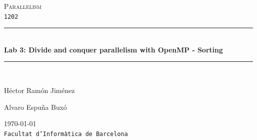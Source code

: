 \documentclass[a4paper,11pt]{article}
\begin{document}
\begin{titlepage}
\begin{center}
\textsc{\Large Parallelism}
\\
\texttt{1202}
\\[1.5cm]
\rule{\linewidth}{0.5mm}
\\[0.4cm]
{\huge
\bfseries
Lab 3: Divide and conquer parallelism with OpenMP - Sorting
\\[0.4cm]
}
\rule{\linewidth}{0.5mm}
\\[2.5cm]
\begin{minipage}{0.4\textwidth}
\begin{flushleft}
\large
Héctor Ramón Jiménez
\end{flushleft}
\end{minipage}
\begin{minipage}{0.4\textwidth}
\begin{flushright}
\large
Alvaro Espuña Buxó
\end{flushright}
\end{minipage}
\vfill
{\large
\today
}
\\
{\large
\texttt{Facultat d'Informàtica de Barcelona}
}
\end{center}
\end{titlepage}
\end{document}

